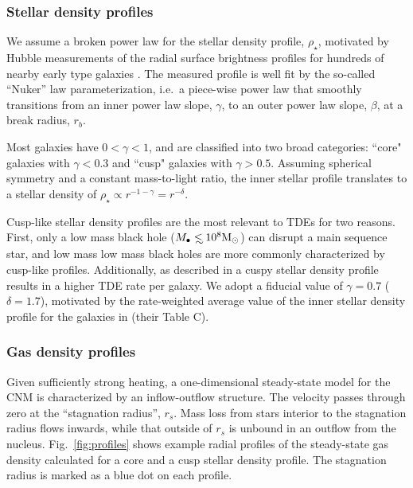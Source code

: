 \documentclass[usenatbib,fleqn]{mnras}
\newcommand\lsim{\mathrel{\rlap{\lower4pt\hbox{\hskip1pt$\sim$}}
    \raise1pt\hbox{$<$}}}
\newcommand{\Mbh}[1][]{M_{\bullet#1}}
\newcommand{\Msun}{{\rm M_\odot}}
\newcommand{\rs}{r_s}
\begin{document}
\subsubsection{Stellar density profiles}
We assume a broken power law for the stellar density profile,
$\rho_{\star}$, motivated by Hubble measurements of the radial surface
brightness profiles for hundreds of nearby early type galaxies
\citep{Lauer+2007}.  The measured profile is well fit by the so-called
``Nuker'' law parameterization, i.e.~a piece-wise power law that smoothly
transitions from an inner power law slope, $\gamma$, to an outer power
law slope, $\beta$, at a break radius, $r_b$.

Most galaxies have $0<\gamma<1$, and are classified into two broad
categories: ``core" galaxies with $\gamma<0.3$ and ``cusp" galaxies with
$\gamma>0.5$. Assuming spherical symmetry and a constant mass-to-light
ratio, the inner stellar profile translates to a stellar density of
$\rho_\star\propto r^{-1-\gamma}=r^{-\delta}$. 

Cusp-like stellar density profiles are the most relevant to TDEs for
two reasons.  First, only a low mass black hole ($\Mbh\lsim 10^8
\Msun$) can disrupt a main sequence star, and low mass low mass black
holes are more commonly characterized by cusp-like profiles.
Additionally, as described in \citet{Stone&Metzger2016} a cuspy
stellar density profile results in a higher TDE rate per galaxy.  We
adopt a fiducial value of $\gamma=0.7$ ($\delta=1.7$), motivated by
the rate-weighted average value of the inner stellar density profile
for the galaxies in \citet{Stone&Metzger2016} (their Table C).


\subsubsection{Gas density profiles}
\label{sec:dProf}
Given sufficiently strong heating, a one-dimensional steady-state
model for the CNM is characterized by an inflow-outflow structure.
The velocity passes through zero at the ``stagnation radius'', $\rs$.
Mass loss from stars interior to the stagnation radius flows inwards,
while that outside of $\rs$ is unbound in an outflow from the nucleus.
Fig.~\ref{fig:profiles} shows example radial profiles of the
steady-state gas density calculated for a core and a cusp stellar
density profile. The stagnation radius is marked as a blue dot on each
profile.
\end{document}
